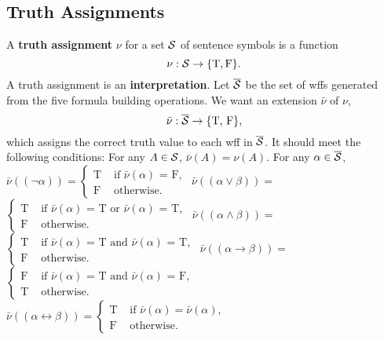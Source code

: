 \documentclass{myproc}
\begin{document}
\subsection{Truth Assignments}
\bit
\w A {\bf{}truth assignment} $\nu$ for a set $\cal{}S$ of sentence
	symbols is a function
		\[ \nu: {\cal{}S} \rightarrow \{\mbox{T}, \mbox{F}\}. \]
	\bit
	\w A truth assignment is an {\bf{}interpretation}.
	\eit
\w Let $\overline{\cal{}S}$ be the set of wffs generated from the five
	formula building operations.
	We want an extension $\bar{\nu}$ of $\nu$,
		\[ \bar{\nu}: \overline{\cal{}S} \rightarrow \{\mbox{T, F}\},\]
	which assigns the correct truth value to each wff in $\overline{\cal{}S}$.
	It should meet the following conditions:
	\ben
	\w [(a)] For any $A \in {\cal{}S}$, $\bar{\nu}(A) = \nu(A)$.
	\w [(b)] For any $\alpha \in \overline{\cal{}S}$,
		\ben
		\w [(1)] $\bar{\nu}((\neg\alpha)) =
		\left\{\begin{array}{ll}
			\mbox{T} & \mbox{\ if $\bar{\nu}(\alpha)$ = F},\\
			\mbox{F} & \mbox{\ otherwise}.
			\end{array}\right.$
		\w [(2)] $\bar{\nu}((\alpha\vee\beta)) =$\\
		$\left\{\begin{array}{ll}
			\mbox{T} & \mbox{\ if $\bar{\nu}(\alpha)$ = T or 
						$\bar{\nu}(\alpha)$ = T},\\
			\mbox{F} & \mbox{\ otherwise}.
			\end{array}\right.$
		\w [(3)] $\bar{\nu}((\alpha\wedge\beta)) =$\\
		$\left\{\begin{array}{ll}
			\mbox{T} & \mbox{\ if $\bar{\nu}(\alpha)$ = T and
			  $\bar{\nu}(\alpha)$ = T},\\
			\mbox{F} & \mbox{\ otherwise}.
			\end{array}\right.$
		\w [(4)] $\bar{\nu}((\alpha\rightarrow\beta)) =$\\
		$\left\{\begin{array}{ll}
			\mbox{F} & \mbox{\ if $\bar{\nu}(\alpha)$ = T and
							$\bar{\nu}(\alpha)$ = F},\\
			\mbox{T} & \mbox{\ otherwise}.
			\end{array}\right.$
		\w [(5)] $\bar{\nu}((\alpha\leftrightarrow\beta)) = \left\{\begin{array}{ll}
			\mbox{T} & \mbox{\ if $\bar{\nu}(\alpha) = \bar{\nu}(\alpha)$},\\
			\mbox{F} & \mbox{\ otherwise}.
			\end{array}\right.$
\end{document}
